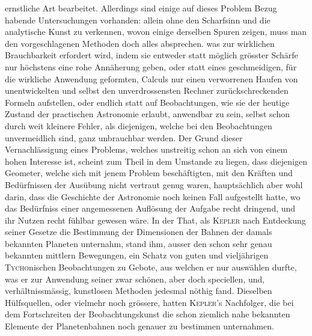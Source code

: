 ernstliche Art bearbeitet. Allerdings sind einige auf dieses Problem Bezug habende Untersuchungen vorhanden: allein ohne den Scharfsinn und die analytische Kunst zu verkennen, wovon einige derselben Spuren zeigen, muss man den vorgeschlagenen Methoden doch alles absprechen. was zur wirklichen Brauchbarkeit erfordert wird, indem sie entweder statt möglich grösster Schärfe nur höchstens eine rohe Annäherung geben, oder statt eines geschmeidigen, für die wirkliche Anwendung geformten, Calculs nur einen verworrenen Haufen von unentwickelten und selbst den unverdrossensten Rechner zurückschreckenden Formeln aufstellen, oder endlich statt auf Beobachtungen, wie sie der heutige Zustand der practischen Astronomie erlaubt, anwendbar zu sein, selbst schon durch weit kleinere Fehler, als diejenigen, welche bei den Beobachtungen unvermeidlich sind, ganz unbrauchbar werden. Der Grund dieser Vernachlässigung eines Problems, welches unstreitig schon an sich von einem hohen Interesse ist, scheint zum Theil in dem Umstande zu liegen, dass diejenigen Geometer, welche sich mit jenem Problem beschäftigten, mit den Kräften und Bedürfnissen der Ausübung nicht vertraut genug waren, hauptsächlich aber wohl darin, dass die Geschichte der Astronomie noch keinen Fall aufgestellt hatte, wo das Bedürfniss einer angemessenen Auflösung der Aufgabe recht dringend, und ihr Nutzen recht fühlbar gewesen wäre. In der That, als \textsc{Kepler} nach Entdeckung seiner Gesetze die Bestimmung der Dimensionen der Bahnen der damals bekannten Planeten unternahm, stand ihm, ausser den schon sehr genau bekannten mittlern Bewegungen, ein Schatz von guten und vieljährigen \textsc{Tycho}nischen Beobachtungen zu Gebote, aus welchen er nur auswählen durfte, was er zur Anwendung seiner zwar schönen, aber doch speciellen, und, verhältnissmässig, kunstlosen Methoden jedesmal nöthig fand. Dieselben Hülfsquellen, oder vielmehr noch grössere, hatten \textsc{Kepler}'s Nachfolger, die bei dem Fortschreiten der Beobachtungskunst die schon ziemlich nahe bekannten Elemente der Planetenbahnen noch genauer zu bestimmen unternahmen.


